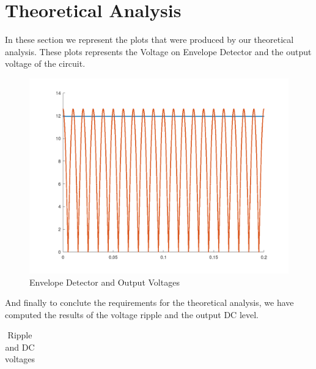 \section{Theoretical Analysis}
\label{sec:analysis}


In these section we represent the plots that were produced by our theoretical analysis. These plots represents the Voltage on Envelope Detector and the output voltage of the circuit.

\begin{figure} [!htb] 
  \includegraphics[width=\linewidth]{Condensador.png}
  \caption{Envelope Detector and Output Voltages}
  \label{fig:theoplots}
  \endminipage\hfill
\end{figure}



And finally to conclute the requirements for the theoretical analysis, we have computed the results of the voltage ripple and the output DC level.

\FloatBarrier
\begin{table}[h]
  \centering
  \begin{tabular}{|c|c|}
    \hline    
    
    \hline
  \end{tabular}
  \caption{Ripple and DC voltages}
  \label{tab:Octave}
\end{table}
\FloatBarrier 


